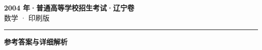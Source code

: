 \documentclass[zihao=5, a4paper]{ctexart}
\begin{document}
\begin{center}
  {\Large\bfseries 2004 年·普通高等学校招生考试·辽宁卷}\\[4pt]
  {\large 数学 · 印刷版}
\end{center}
\medskip
{}

\par\bigskip\hrule\bigskip
{}
\begin{center}{\large\bfseries 参考答案与详细解析}\end{center}
\smallskip

\end{document}
